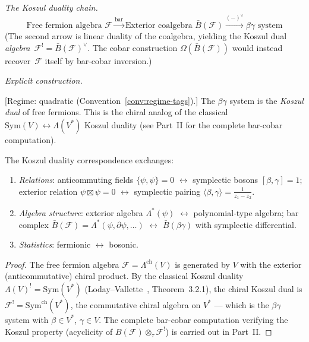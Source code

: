 \begin{example}
\label{ex:fermion-betagamma-bar-cobar}

\emph{The Koszul duality chain.}
\[\text{Free fermion algebra } \mathcal{F} \xrightarrow{\text{bar}} \text{Exterior coalgebra }
\bar{B}(\mathcal{F}) \xrightarrow{(-)^\vee} \beta\gamma \text{ system}\]
(The second arrow is linear duality of the coalgebra, yielding the Koszul dual \emph{algebra}~$\mathcal{F}^! = \bar{B}(\mathcal{F})^\vee$.  The cobar construction $\Omega(\bar{B}(\mathcal{F}))$ would instead recover~$\mathcal{F}$ itself by bar-cobar inversion.)

\emph{Explicit construction.}

\begin{theorem}\label{thm:fermion-boson-koszul}

\smallskip\noindent
\textup{[Regime: quadratic
\textup{(}Convention~\textup{\ref{conv:regime-tags}}\textup{)}.]}
The $\beta\gamma$ system is the \emph{Koszul dual} of free fermions.
This is the chiral analog of the classical
$\mathrm{Sym}(V) \leftrightarrow \Lambda(V^*)$ Koszul duality
(see Part~II for the complete bar-cobar computation).

The Koszul duality correspondence exchanges:
\begin{enumerate}
\item \emph{Relations}: anticommuting fields $\{\psi, \psi\} = 0$ $\leftrightarrow$ symplectic bosons $[\beta,\gamma] = 1$; exterior relation $\psi \boxtimes \psi = 0$ $\leftrightarrow$ symplectic pairing $\langle \beta, \gamma \rangle = \frac{1}{z_1-z_2}$.

\item \emph{Algebra structure}: exterior algebra $\Lambda^*(\psi)$ $\leftrightarrow$ polynomial-type algebra; bar complex $\bar{B}(\mathcal{F}) = \Lambda^*(\psi, \partial\psi, \ldots)$ $\leftrightarrow$ $\bar{B}(\beta\gamma)$ with symplectic differential.

\item \emph{Statistics}: fermionic $\leftrightarrow$ bosonic.
\end{enumerate}
\end{theorem}

\begin{proof}
The free fermion algebra $\mathcal{F} = \Lambda^{\mathrm{ch}}(V)$ is generated by $V$ with the exterior (anticommutative) chiral product.  By the classical Koszul duality $\Lambda(V)^! = \mathrm{Sym}(V^*)$ (Loday--Vallette~\cite{LV12}, Theorem~3.2.1), the chiral Koszul dual is $\mathcal{F}^! = \mathrm{Sym}^{\mathrm{ch}}(V^*)$, the commutative chiral algebra on $V^*$ --- which is the $\beta\gamma$ system with $\beta \in V^*$, $\gamma \in V$.  The complete bar-cobar computation verifying the Koszul property (acyclicity of $B(\mathcal{F}) \otimes_\tau \mathcal{F}^!$) is carried out in Part~II.
\end{proof}


\end{example}
